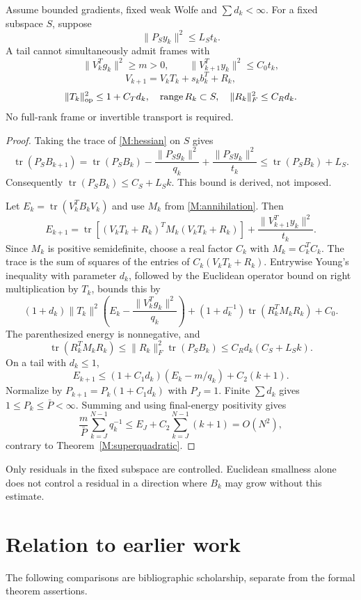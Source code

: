 \begin{theorem}\label{M:residualtheorem}
Assume bounded gradients, fixed weak Wolfe and $\sum d_k<\infty$. For a fixed subspace $S$, suppose
\[
 \|P_Sy_k\|^2\le L_St_k.
\]
A tail cannot simultaneously admit frames with
\[
 \|V_k^Tg_k\|^2\ge m>0,\qquad\|V_{k+1}^Ty_k\|^2\le C_0t_k,
\]
\[
 V_{k+1}=V_kT_k+s_kb_k^T+R_k,
\]
\[
 \|T_k\|_{\rm op}^2\le1+C_Td_k,\quad\operatorname{range}R_k\subset S,
 \quad\|R_k\|_F^2\le C_Rd_k.
\]
No full-rank frame or invertible transport is required.
\end{theorem}
\begin{proof}
Taking the trace of \eqref{M:hessian} on $S$ gives
\[
 \operatorname{tr}(P_SB_{k+1})
 =\operatorname{tr}(P_SB_k)-\frac{\|P_Sg_k\|^2}{q_k}
 +\frac{\|P_Sy_k\|^2}{t_k}
 \le\operatorname{tr}(P_SB_k)+L_S.
\]
Consequently $\operatorname{tr}(P_SB_k)\le C_S+L_Sk$. This bound is derived, not imposed.

Let $E_k=\operatorname{tr}(V_k^TB_kV_k)$ and use $M_k$ from \eqref{M:annihilation}. Then
\[
 E_{k+1}=\operatorname{tr}\!\left[(V_kT_k+R_k)^TM_k(V_kT_k+R_k)\right]
 +\frac{\|V_{k+1}^Ty_k\|^2}{t_k}.
\]
Since $M_k$ is positive semidefinite, choose a real factor $C_k$ with $M_k=C_k^TC_k$. The trace is the sum of squares of the entries of $C_k(V_kT_k+R_k)$. Entrywise Young's inequality with parameter $d_k$, followed by the Euclidean operator bound on right multiplication by $T_k$, bounds this by
\[
 (1+d_k)\|T_k\|^2\left(E_k-\frac{\|V_k^Tg_k\|^2}{q_k}\right)
 +(1+d_k^{-1})\operatorname{tr}(R_k^TM_kR_k)+C_0.
\]
The parenthesized energy is nonnegative, and
\[
 \operatorname{tr}(R_k^TM_kR_k)
 \le\|R_k\|_F^2\operatorname{tr}(P_SB_k)
 \le C_Rd_k(C_S+L_Sk).
\]
On a tail with $d_k\le1$,
\[
 E_{k+1}\le(1+C_1d_k)(E_k-m/q_k)+C_2(k+1).
\]
Normalize by $P_{k+1}=P_k(1+C_1d_k)$ with $P_J=1$. Finite $\sum d_k$ gives $1\le P_k\le\bar P<\infty$. Summing and using final-energy positivity gives
\[
 \frac m{\bar P}\sum_{k=J}^{N-1}q_k^{-1}
 \le E_J+C_2\sum_{k=J}^{N-1}(k+1)=O(N^2),
\]
contrary to Theorem~\ref{M:superquadratic}.
\end{proof}
Only residuals in the fixed subspace are controlled. Euclidean smallness alone does not control a residual in a direction where $B_k$ may grow without this estimate.


\section*{Relation to earlier work}
The following comparisons are bibliographic scholarship, separate from the formal theorem assertions.

